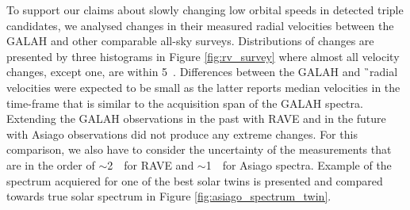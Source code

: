 \begin{figure}
		
\end{figure}

To support our claims about slowly changing low orbital speeds in detected triple candidates, we analysed changes in their measured radial velocities between the GALAH and other comparable all-sky surveys. Distributions of changes are presented by three histograms in Figure \ref{fig:rv_survey} where almost all velocity changes, except one, are within 5~\kms. Differences between the GALAH and \G\ radial velocities were expected to be small as the latter reports median velocities in the time-frame that is similar to the acquisition span of the GALAH spectra. Extending the GALAH observations in the past with RAVE \cite{2017AJ....153...75K} and in the future with Asiago observations did not produce any extreme changes. For this comparison, we also have to consider the uncertainty of the measurements that are in the order of $\sim$2~\kms\ for RAVE and $\sim$1~\kms\ for Asiago spectra. Example of the spectrum acquiered for one of the best solar twins is presented and compared towards true solar spectrum in Figure \ref{fig:asiago_spectrum_twin}.

